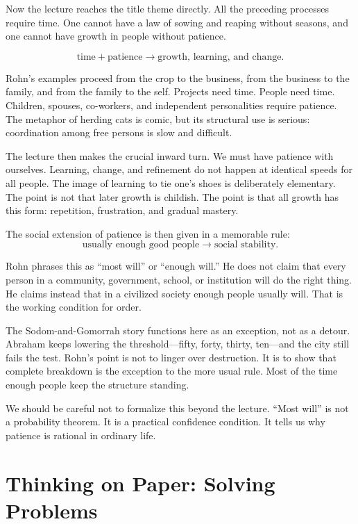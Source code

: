 Now the lecture reaches the title theme directly. All the preceding processes require time. One cannot have a law of sowing and reaping without seasons, and one cannot have growth in people without patience.

\begin{equation}
\text{time} + \text{patience} \rightarrow \text{growth, learning, and change}.
\end{equation}

Rohn's examples proceed from the crop to the business, from the business to the family, and from the family to the self. Projects need time. People need time. Children, spouses, co-workers, and independent personalities require patience. The metaphor of herding cats is comic, but its structural use is serious: coordination among free persons is slow and difficult.

The lecture then makes the crucial inward turn. We must have patience with ourselves. Learning, change, and refinement do not happen at identical speeds for all people. The image of learning to tie one's shoes is deliberately elementary. The point is not that later growth is childish. The point is that all growth has this form: repetition, frustration, and gradual mastery.

The social extension of patience is then given in a memorable rule:
\begin{equation}
\text{usually enough good people} \rightarrow \text{social stability}.
\end{equation}

Rohn phrases this as ``most will'' or ``enough will.'' He does not claim that every person in a community, government, school, or institution will do the right thing. He claims instead that in a civilized society enough people usually will. That is the working condition for order.

The Sodom-and-Gomorrah story functions here as an exception, not as a detour. Abraham keeps lowering the threshold---fifty, forty, thirty, ten---and the city still fails the test. Rohn's point is not to linger over destruction. It is to show that complete breakdown is the exception to the more usual rule. Most of the time enough people keep the structure standing.

We should be careful not to formalize this beyond the lecture. ``Most will'' is not a probability theorem. It is a practical confidence condition. It tells us why patience is rational in ordinary life.

\section{Thinking on Paper: Solving Problems}

